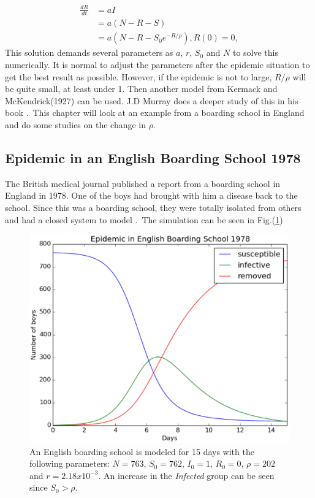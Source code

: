 \documentclass[%
twoside,                 %
final,                   %
10pt]{article}
\begin{document}
\begin{equation} \label{eq:dR_normal}
	\begin{aligned} 
	\frac{dR}{dt} &= aI\\
	&= a(N-R-S)\\
	&= a(N-R-S_0e^{-R/\rho}), R(0)=0,
	\end{aligned}
\end{equation}
This solution demands several parameters as $a$, $r$, $S_0$ and $N$ to solve this numerically. It is normal to adjust the parameters after the epidemic situation to get the best result as possible. However, if the epidemic is not to large, $R/\rho$ will be quite small, at least under 1. Then another model from Kermack and McKendrick(1927) can be used. J.D Murray does a deeper study of this in his book \cite[p.~324]{murray2002mathematical}.~This chapter will look at an example from a boarding school in England and do some studies on the change in $\rho$.  

\subsection{Epidemic in an English Boarding School 1978}
The British medical journal published a report from a boarding school in England in 1978. One of the boys had brought with him a disease back to the school. Since this was a boarding school, they were totally isolated from others and had a closed system to model \cite[p.~325]{murray2002mathematical}.~The simulation can be seen in Fig.(\ref{fig:english_boarding})  


\begin{figure}[ht]
  \centerline{\includegraphics[width=0.9\linewidth]{plots/English_boarding_school.eps}}
  \caption{
  \label{fig:english_boarding} An English boarding school is modeled for 15 days with the following parameters: $N=763$, $S_0=762$, $I_0=1$, $R_0=0$, $\rho=202$ and $r=2.18 x 10^{-3}$. An increase in the \emph{Infected} group can be seen since $S_0 > \rho$.
  }
\end{figure}
\end{document}
